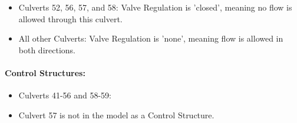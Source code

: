 \begin{itemize}

\item Culverts \textcolor[rgb]{1.00,0.00,0.00}{52, 56}, 57, and \textcolor[rgb]{1.00,0.00,0.00}{58}: Valve Regulation is 'closed', meaning no flow is allowed through this culvert.

\item All other Culverts: Valve Regulation is 'none', meaning flow is allowed in both directions.


\end{itemize}

\paragraph{Control Structures:}

\begin{itemize}

\item Culverts 41-56 and 58-59:


\item Culvert 57 is not in the model as a Control Structure.

\end{itemize}

